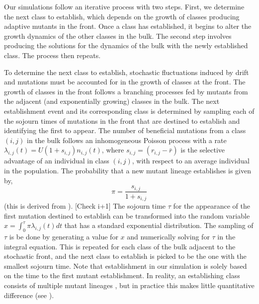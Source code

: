\documentclass[9pt,twocolumn,twoside]{gsajnl}
\begin{document}
Our simulations follow an iterative process with two steps. First, we determine the next class to establish, which depends on the growth of classes producing adaptive mutants in the front. Once a class has established, it begins to alter the growth dynamics of the other classes in the bulk. The second step involves producing the solutions for the dynamics of the bulk with the newly established class. The process then repeats. \par

To determine the next class to establish, stochastic fluctuations induced by drift and mutations must be accounted for in the growth of classes at the front. The growth of classes in the front follows a branching processes fed by mutants from the adjacent (and exponentially growing) classes in the bulk.  The next establishment event and its corresponding class  is determined by sampling each of the sojourn times of mutations in the front that are destined to establish and identifying the first to appear.   The number of beneficial mutations from a class $(i,j)$ in the bulk follows an inhomogeneous Poisson  process with a rate $\lambda_{i,j}(t)=U (1+s_{i,j}) n_{i,j}(t)$, where $s_{i,j}=(r_{i,j}-\bar{r})$ is the selective advantage of an individual in class $(i,j)$, with respect to an average individual in the population. The probability that a new mutant lineage establishes is given by, 
\begin{equation} \label{eq:2}
\pi = \frac{s_{i,j}}{ 1+s_{i,j}}
\end{equation}
(this is derived from \cite[Equation 16]{desai2007beneficial}). [Check i+1] The sojourn time $\tau$ for the appearance of the first mutation destined to establish can be transformed into the random variable $x=\int_0^\tau \pi \lambda_{i,j}(t) dt$ that has a standard exponential distribution. The sampling of $\tau$ is be done by generating a value for  $x$ and numerically solving for $\tau$ in the integral equation. This is repeated for each class of the bulk adjacent to the stochastic front, and the next class to establish is picked to be the one with the smallest sojourn time. Note that establishment in our simulation is solely based on the time to the first mutant establishment. In reality, an establishing class consists of multiple mutant lineages \cite{Desai2013}, but in practice this makes little quantitative difference (see \cite[p.1773]{desai2007beneficial}). \par
\end{document}

